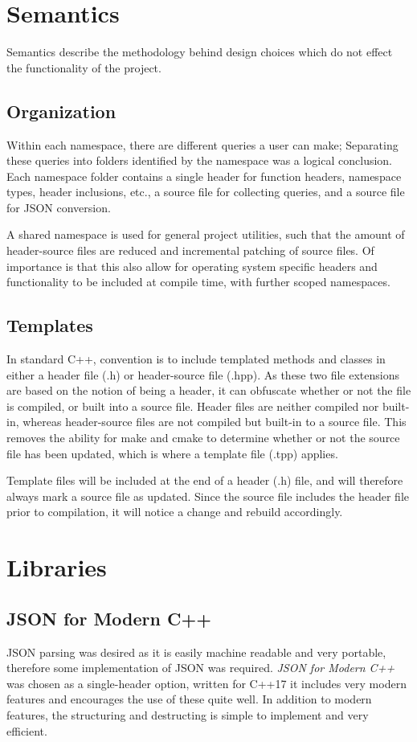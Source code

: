 \documentclass[conference]{IEEEtran}
\begin{document}
\section{Semantics}
Semantics describe the methodology behind design choices which do not effect the functionality of the project.

\subsection{Organization}
Within each namespace, there are different queries a user can make;
Separating these queries into folders identified by the namespace was a logical conclusion.
Each namespace folder contains a single header for function headers, namespace types, header inclusions, etc.,
a source file for collecting queries, and a source file for JSON conversion.

A shared namespace is used for general project utilities, such that the amount of header-source files are reduced and
incremental patching of source files. Of importance is that this also allow for operating system specific
headers and functionality to be included at compile time, with further scoped namespaces.

\subsection{Templates}
In standard C++, convention is to include templated methods and classes in either a header file (.h) or header-source file (.hpp).
As these two file extensions are based on the notion of being a header, it can obfuscate whether or not the file is compiled, or built into a source file.
Header files are neither compiled nor built-in, whereas header-source files are not compiled but built-in to a source file.
This removes the ability for make and cmake to determine whether or not the source file has been updated, which is where a template file (.tpp) applies.

Template files will be included at the end of a header (.h) file, and will therefore always mark a source file as updated.
Since the source file includes the header file prior to compilation, it will notice a change and rebuild accordingly.

\section{Libraries}

\subsection{JSON for Modern C++}
JSON parsing was desired as it is easily machine readable and very portable, therefore some implementation of JSON was required.
\textit{JSON for Modern C++} was chosen as a single-header option, written for C++17 it includes very modern features and encourages the use of these quite well.
In addition to modern features, the structuring and destructing is simple to implement and very efficient.
\end{document}
